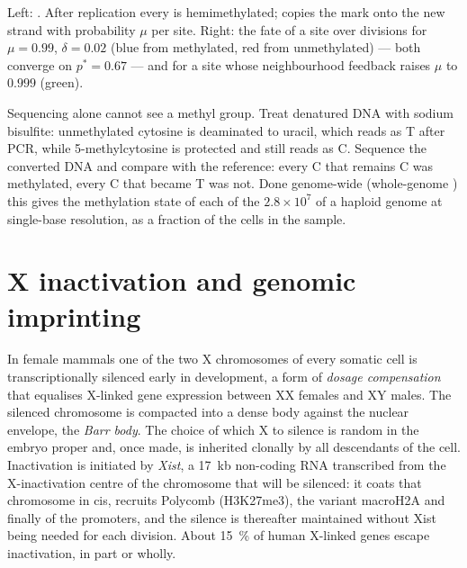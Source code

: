 \begin{omfigure}
{\small Left: . After replication every  is
hemimethylated;  copies the mark onto the new strand with
probability $\mu$ per site. Right: the fate of a site over divisions
for $\mu = 0.99$, $\delta = 0.02$ (blue from methylated, red from
unmethylated) --- both converge on $p^{*} = 0.67$ --- and for a site
whose neighbourhood feedback raises $\mu$ to $0.999$ (green).}
\end{omfigure}

\begin{method}\label{met:b3:chromatin-epigenetics:bisulfite}
Sequencing alone cannot see a methyl group. Treat denatured DNA with
sodium bisulfite: unmethylated cytosine is deaminated to uracil, which
reads as T after PCR, while 5-methylcytosine is protected and still
reads as C. Sequence the converted DNA and compare with the reference:
every C that remains C was methylated, every C that became T was not.
Done genome-wide (whole-genome ) this gives the
methylation state of each of the $2.8\times 10^{7}$  of a haploid
genome at single-base resolution, as a fraction of the cells in the
sample.
\end{method}

\section{X inactivation and genomic imprinting}

\begin{definition}\label{def:b3:chromatin-epigenetics:x-inactivation}
In female mammals one of the two X chromosomes of every somatic cell
is transcriptionally silenced early in development, a form of
\emph{dosage compensation} that equalises X-linked gene expression
between XX females and XY males. The silenced chromosome is compacted
into a dense body against the nuclear envelope, the \emph{Barr body}.
The choice of which X to silence is random in the embryo proper and,
once made, is inherited clonally by all descendants of the cell.
Inactivation is initiated by \emph{Xist}, a \qty{17}{kb} non-coding RNA
transcribed from the X-inactivation centre of the chromosome that will
be silenced: it coats that chromosome in cis, recruits Polycomb (H3K27me3),
the  variant macroH2A and finally  of the
promoters, and the silence is thereafter maintained without Xist
being needed for each division. About \qty{15}{\%} of human X-linked
genes escape inactivation, in part or wholly.
\end{definition}

